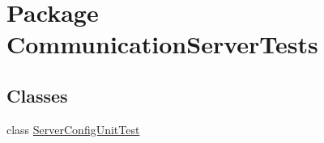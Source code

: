 \hypertarget{namespace_communication_server_tests}{}\section{Package Communication\+Server\+Tests}
\label{namespace_communication_server_tests}
\subsection*{Classes}
\begin{DoxyCompactItemize}
\item 
class \hyperlink{class_communication_server_tests_1_1_server_config_unit_test}{Server\+Config\+Unit\+Test}
\end{DoxyCompactItemize}
